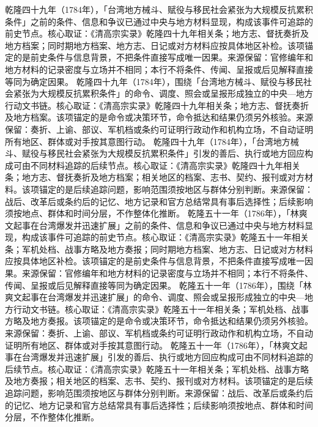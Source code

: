 乾隆四十九年（1784年），「台湾地方械斗、赋役与移民社会紧张为大规模反抗累积条件」之前的条件、信息和争议已通过中央与地方材料显现，构成该事件可追踪的前史节点。核心取证：《清高宗实录》乾隆四十九年相关条；地方志、督抚奏折及地方档案；同时期地方档案、地方志、日记或对方材料应按具体地区补检。该项锚定的是前史条件与信息背景，不把条件直接写成唯一因果。来源保留：官修编年和地方材料的记录密度与立场并不相同；本行不将条件、传闻、呈报或后见解释直接等同为确定因果。
乾隆四十九年（1784年），围绕「台湾地方械斗、赋役与移民社会紧张为大规模反抗累积条件」的命令、调度、照会或呈报形成独立的中央—地方行动文书链。核心取证：《清高宗实录》乾隆四十九年相关条；地方志、督抚奏折及地方档案。该项锚定的是命令或决策环节，命令抵达和结果仍须另外核验。来源保留：奏折、上谕、部议、军机档或条约可证明行政动作和机构立场，不自动证明所有地区、群体或对手按其意图行动。
乾隆四十九年（1784年），「台湾地方械斗、赋役与移民社会紧张为大规模反抗累积条件」引发的善后、执行或地方回应构成可由不同材料追踪的后续节点。核心取证：《清高宗实录》乾隆四十九年相关条；地方志、督抚奏折及地方档案；相关地区的档案、志书、契约、报刊或对方材料。该项锚定的是后续追踪问题，影响范围须按地区与群体分别判断。来源保留：战后、改革后或条约后的记忆、地方记录和官方总结常具有事后选择性；后续影响须按地点、群体和时间分层，不作整体化推断。
乾隆五十一年（1786年），「林爽文起事在台湾爆发并迅速扩展」之前的条件、信息和争议已通过中央与地方材料显现，构成该事件可追踪的前史节点。核心取证：《清高宗实录》乾隆五十一年相关条；军机处档、战事方略及地方奏报；同时期地方档案、地方志、日记或对方材料应按具体地区补检。该项锚定的是前史条件与信息背景，不把条件直接写成唯一因果。来源保留：官修编年和地方材料的记录密度与立场并不相同；本行不将条件、传闻、呈报或后见解释直接等同为确定因果。
乾隆五十一年（1786年），围绕「林爽文起事在台湾爆发并迅速扩展」的命令、调度、照会或呈报形成独立的中央—地方行动文书链。核心取证：《清高宗实录》乾隆五十一年相关条；军机处档、战事方略及地方奏报。该项锚定的是命令或决策环节，命令抵达和结果仍须另外核验。来源保留：奏折、上谕、部议、军机档或条约可证明行政动作和机构立场，不自动证明所有地区、群体或对手按其意图行动。
乾隆五十一年（1786年），「林爽文起事在台湾爆发并迅速扩展」引发的善后、执行或地方回应构成可由不同材料追踪的后续节点。核心取证：《清高宗实录》乾隆五十一年相关条；军机处档、战事方略及地方奏报；相关地区的档案、志书、契约、报刊或对方材料。该项锚定的是后续追踪问题，影响范围须按地区与群体分别判断。来源保留：战后、改革后或条约后的记忆、地方记录和官方总结常具有事后选择性；后续影响须按地点、群体和时间分层，不作整体化推断。
